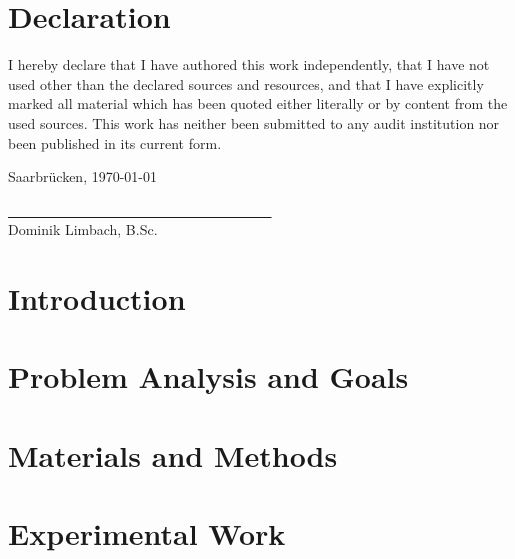 \documentclass[
    12pt,
    a4paper,
	chapterprefix=false,
	parskip=full,
	headings=normal,
	numbers=noenddot
]{scrreprt}
\begin{document}


\newpage

\chapter*{Declaration}

I hereby declare that I have authored this work independently, that I have not used other than the declared sources and resources, and that I have explicitly marked all material which has been quoted either literally or by content from the used sources. This work has neither been submitted to any audit institution nor been published in its current form.\\

\vspace{1cm}

Saarbrücken, \today\\

\vspace{1.5cm}

\underline{~ ~ ~ ~ ~ ~ ~ ~ ~ ~ ~ ~ ~ ~ ~ ~ ~ ~ ~ ~ ~ ~ ~}\\
\small
Dominik Limbach, B.Sc.
\normalsize

\newpage

\renewcommand{\contentsname}{Contents}
\hypersetup{linkcolor=black}
\tableofcontents
\hypersetup{linkcolor=darkblue}

\newpage


\chapter{Introduction}




\chapter{Problem Analysis and Goals}




\chapter{Materials and Methods}



\chapter{Experimental Work}
\end{document}
